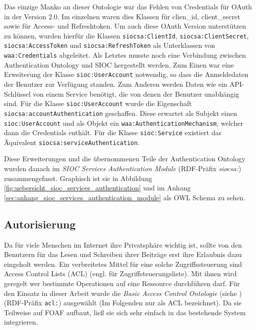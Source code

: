 Das einzige Manko an dieser Ontologie war das Fehlen von Credentials für OAuth in der Version 2.0. Im einzelnen waren dies Klassen für clien\_id, client\_secret sowie für Access- und Refreshtoken. Um auch diese OAuth Version unterstützen zu können, wurden hierfür die Klassen \texttt{siocsa:ClientId}, \texttt{siocsa:ClientSecret}, \texttt{siocsa:AccessToken} und \texttt{siocsa:RefreshToken} als Unterklassen von \texttt{waa:Credentials} abgeleitet. Als Letztes musste noch eine Verbindung zwischen Authentication Ontology und SIOC hergestellt werden. Zum Einen war eine Erweiterung der Klasse \texttt{sioc:UserAccount} notwendig, so dass die Anmeldedaten der Benutzer zur Verfügung standen. Zum Anderen werden Daten wie ein API-Schlüssel von einem Service benötigt, die von denen der Benutzer unabhängig sind. Für die Klasse \texttt{sioc:UserAccount} wurde die Eigenschaft \texttt{siocsa:accountAuthentication} geschaffen. Diese erwartet als Subjekt einen \texttt{sioc:UserAccount} und als Objekt ein \texttt{waa:AuthenticationMechanism}, welcher dann die Credentials enthält. Für die Klasse \texttt{sioc:Service} existiert das Äquivalent \texttt{siocsa:serviceAuthentication}. 

Diese Erweiterungen und die übernommenen Teile der Authentication Ontology wurden danach im \emph{SIOC Services Authentication Module} (RDF-Präfix \emph{siocsa:}) zusammengefasst. Graphisch ist sie in Abbildung \ref{fig:uebersicht_sioc_services_authentication} und im Anhang \ref{sec:anhang_sioc_services_authentication_module} als OWL Schema zu sehen. 


\subsection{Autorisierung} %
\label{sub:autorisierung}

Da für viele Menschen im Internet ihre Privatsphäre wichtig ist, sollte von den Benutzern für das Lesen und Schreiben ihrer Beiträge erst ihre Erlaubnis dazu eingeholt werden. Ein verbreitetes Mittel für eine solche Zugriffssteuerung sind Access Control Lists (ACL) (engl. für Zugriffsteuerungsliste). Mit ihnen wird geregelt wer bestimmte Operationen auf eine Ressource durchführen darf. Für den Einsatz in dieser Arbeit wurde die \emph{Basic Access Control Ontologie} (siehe \cite{Hollenbach2009,wiki:wacl})(RDF-Präfix \texttt{acl:}) ausgewählt (Im Folgenden nur als ACL bezeichnet). Da sie Teilweise auf FOAF aufbaut, ließ sie sich sehr einfach in das bestehende System integrieren.

